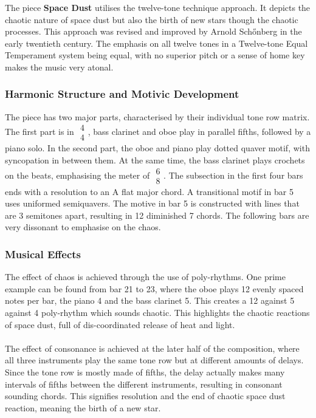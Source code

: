 \documentclass{article}
\begin{document}
The piece \textbf{Space Dust} utilises the twelve-tone technique approach. It
depicts the chaotic nature of space dust but also the birth of new stars though
the chaotic processes. This approach was revised and improved by Arnold
Schőnberg in the early twentieth century. The emphasis on all twelve tones in a
Twelve-tone Equal Temperament system being equal, with no superior pitch or a sense of home key makes
the music very atonal.

\subsubsection{Harmonic Structure and Motivic Development}

The piece has two major parts, characterised by their individual tone row
matrix. The first part is in \(\begin{array}{c}4\\4\end{array}\), bass clarinet and oboe play in parallel fifths,
followed by a piano solo. In the second part, the oboe and piano play dotted
quaver motif, with syncopation in between them. At the same time, the bass
clarinet plays crochets on the beats, emphasising the meter of
\(\begin{array}{c}6\\8\end{array}\).  The subsection in the first four bars ends
	with a resolution to an A flat major chord. A transitional motif in bar
	5 uses uniformed semiquavers. The motive in bar 5 is constructed with
	lines that are 3 semitones apart, resulting in 12 diminished 7 chords.
	The following bars are very dissonant to emphasise on the chaos.

\subsubsection{Musical Effects}

The effect of chaos is achieved through the use of poly-rhythms. One prime example can be found from bar 21 to 23, where the oboe plays 12 evenly spaced notes per bar, the piano 4 and the bass clarinet 5. This creates a 12 against 5 against 4 poly-rhythm which sounds chaotic. This highlights the chaotic reactions of space dust, full of dis-coordinated release of heat and light.
\\
\\
The effect of consonance is achieved at the later half of the composition, where all three instruments play the same tone row but at different amounts of delays. Since the tone row is mostly made of fifths, the delay actually makes many intervals of fifths between the different instruments, resulting in consonant sounding chords. This signifies resolution and the end of chaotic space dust reaction, meaning the birth of a new star.
\end{document}
